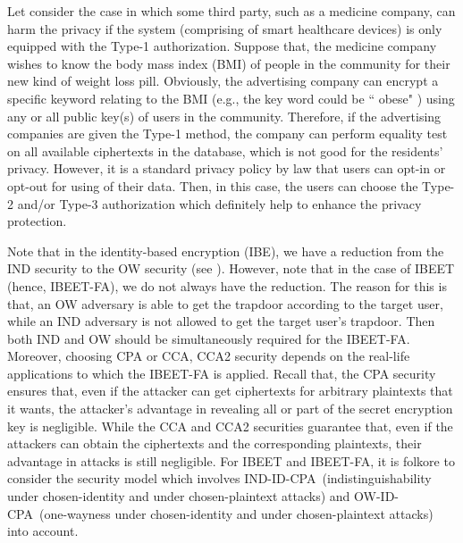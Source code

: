 \documentclass[runningheads,10pt]{llncs}
\def\OW{\textsf{OW-ID-CPA}}
\def\IND{\textsf{IND-ID-CPA}}
\begin{document}
Let consider the case  in which some third party, such as a medicine company, can harm the privacy if the system (comprising of smart healthcare devices) is only equipped with the Type-1 authorization.  Suppose that, the medicine company wishes to know the body mass index (BMI) of people in the community for their new kind of weight loss pill.  Obviously, the advertising company can encrypt a specific keyword relating to the BMI (e.g., the key word could be  `` obese" ) using any or all public key(s) of users in the community. Therefore, if the  advertising companies are given the Type-1 method,  the company can perform equality test on all available ciphertexts in the database, which is not good for the residents' privacy.   However, it is a standard privacy policy by law that users can opt-in or opt-out for using of their data.  Then, in this case, the users can choose the Type-2 and/or Type-3 authorization which definitely help to enhance the privacy protection.

Note that in the identity-based encryption (IBE), we have a reduction from the IND security to the OW security (see \cite[Table 1]{GH05}). However, note that in the case of IBEET (hence, IBEET-FA), we do not always have the reduction. The reason for this is that, an OW adversary is able to get the trapdoor according to the target user, while an IND adversary is not allowed to get the target user's trapdoor. Then both IND and OW should be simultaneously required for the IBEET-FA. Moreover, choosing CPA or CCA, CCA2 security depends on the real-life applications to which the IBEET-FA is applied. Recall that, the CPA security ensures that, even if the attacker can get ciphertexts for arbitrary plaintexts that it wants, the  attacker's advantage in  revealing all or part of the secret encryption key is negligible. While the CCA and CCA2 securities guarantee that, even if the attackers can obtain the ciphertexts and the corresponding plaintexts, their advantage in attacks is still negligible. For IBEET and IBEET-FA, it is folkore to consider the security model which involves \IND~(indistinguishability under chosen-identity and under chosen-plaintext attacks) and \OW~(one-wayness under chosen-identity and under chosen-plaintext attacks) into account.\\
\end{document}
